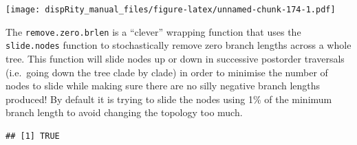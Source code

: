 \documentclass[
]{book}
\newenvironment{Shaded}{\begin{snugshade}}{\end{snugshade}}
\newcommand{\CommentTok}[1]{\textcolor[rgb]{0.56,0.35,0.01}{\textit{#1}}}
\newcommand{\DataTypeTok}[1]{\textcolor[rgb]{0.13,0.29,0.53}{#1}}
\newcommand{\DecValTok}[1]{\textcolor[rgb]{0.00,0.00,0.81}{#1}}
\newcommand{\KeywordTok}[1]{\textcolor[rgb]{0.13,0.29,0.53}{\textbf{#1}}}
\newcommand{\NormalTok}[1]{#1}
\newcommand{\OperatorTok}[1]{\textcolor[rgb]{0.81,0.36,0.00}{\textbf{#1}}}
\newcommand{\StringTok}[1]{\textcolor[rgb]{0.31,0.60,0.02}{#1}}
\begin{document}
\texttt{[image: dispRity\_manual\_files/figure-latex/unnamed-chunk-174-1.pdf]}

The \texttt{remove.zero.brlen} is a ``clever'' wrapping function that uses the \texttt{slide.nodes} function to stochastically remove zero branch lengths across a whole tree.
This function will slide nodes up or down in successive postorder traversals (i.e.~going down the tree clade by clade) in order to minimise the number of nodes to slide while making sure there are no silly negative branch lengths produced!
By default it is trying to slide the nodes using 1\% of the minimum branch length to avoid changing the topology too much.

\begin{Shaded}
\end{Shaded}

\begin{verbatim}
## [1] TRUE
\end{verbatim}

\begin{Shaded}
\end{Shaded}
\end{document}
